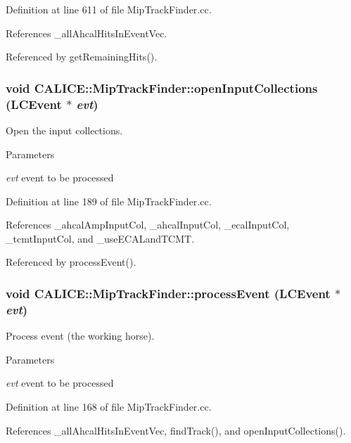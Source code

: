 Definition at line 611 of file MipTrackFinder.cc.

References \_\-allAhcalHitsInEventVec.

Referenced by getRemainingHits().
\subsubsection[{openInputCollections}]{\setlength{\rightskip}{0pt plus 5cm}void CALICE::MipTrackFinder::openInputCollections (LCEvent $\ast$ {\em evt})\hspace{0.3cm}{\ttfamily  [private]}}\label{classCALICE_1_1MipTrackFinder_aef01541bca92914602f72de4324e85e7}


Open the input collections. 
\begin{DoxyParams}{Parameters}
\item[{\em evt}]event to be processed \end{DoxyParams}


Definition at line 189 of file MipTrackFinder.cc.

References \_\-ahcalAmpInputCol, \_\-ahcalInputCol, \_\-ecalInputCol, \_\-tcmtInputCol, and \_\-useECALandTCMT.

Referenced by processEvent().
\subsubsection[{processEvent}]{\setlength{\rightskip}{0pt plus 5cm}void CALICE::MipTrackFinder::processEvent (LCEvent $\ast$ {\em evt})\hspace{0.3cm}{\ttfamily  [virtual]}}\label{classCALICE_1_1MipTrackFinder_ababe992d9a74a41efb4af9726302f1bf}


Process event (the working horse). 
\begin{DoxyParams}{Parameters}
\item[{\em evt}]event to be processed \end{DoxyParams}


Definition at line 168 of file MipTrackFinder.cc.

References \_\-allAhcalHitsInEventVec, findTrack(), and openInputCollections().
